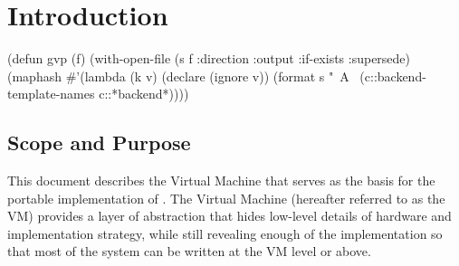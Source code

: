 \chapter{Introduction} %

(defun gvp (f)
  (with-open-file (s f :direction :output :if-exists :supersede)
    (maphash \#'(lambda (k v)
		 (declare (ignore v))
		 (format s "~A~%
	     (c::backend-template-names c::*backend*))))


\section{Scope and Purpose}

This document describes the Virtual Machine that serves as the basis for the
portable implementation of \ccl.  The Virtual Machine (hereafter referred to as
the VM) provides a layer of abstraction that hides low-level details of
hardware and implementation strategy, while still revealing enough of the
implementation so that most of the system can be written at the VM level or
above.

